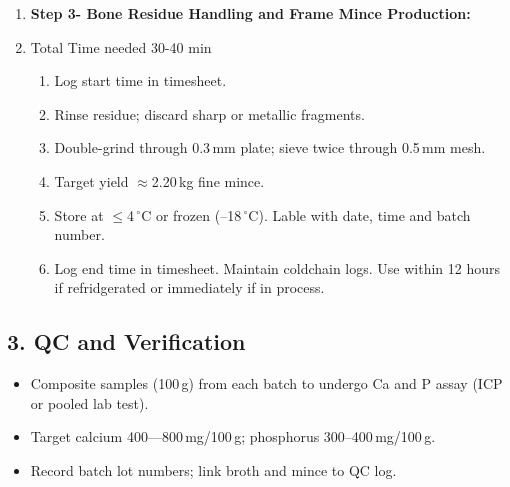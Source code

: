 \begin{enumerate}
  \item \textbf{Step 3- Bone Residue Handling and Frame Mince Production:}
  \item Total Time needed 30-40 min 
    \begin{enumerate}
     \item Log start time in timesheet.
      \item Rinse residue; discard sharp or metallic fragments.
      \item Double-grind through 0.3\,mm plate; sieve twice through 0.5\,mm mesh.
      \item Target yield $\approx$2.20\,kg fine mince.
      \item Store at $\leq$4\,$^{\circ}$C or frozen (–18\,$^{\circ}$C). Lable with date, time and batch number.
      \item Log end time in timesheet.  Maintain coldchain logs. Use within 12 hours if refridgerated or immediately if in process.
    \end{enumerate}
\end{enumerate}

\subsection*{3. QC and Verification}
\begin{itemize}
  \item Composite samples (100\,g) from each batch to undergo Ca and P assay (ICP or pooled lab test).
  \item Target calcium 400---800\,mg/100\,g; phosphorus 300--400\,mg/100\,g.
  \item Record batch lot numbers; link broth and mince to QC log.
\end{itemize}
